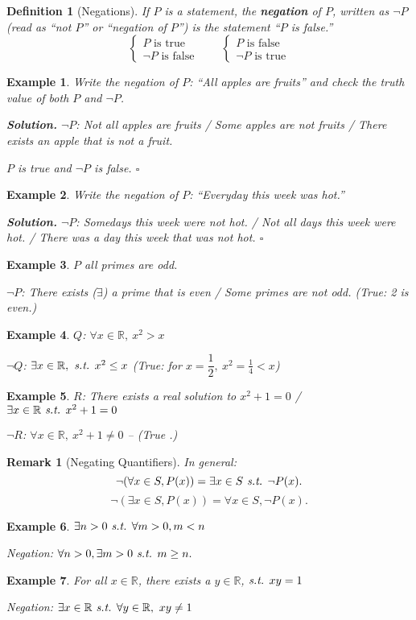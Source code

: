 \documentclass[12pt,a4paper]{article}
\newtheorem{df}{Definition}[subsection]
\newtheorem{eg}{Example}[subsection]
\newenvironment*{sol}{\par\indent\textbf{\textit{Solution. }}}{\hfill{$\square$}\par}
\newtheorem*{rmk}{\indent Remark}
\def\R{{\mathbb{R}}}
\def\st{\emph{ s.t. }}
\begin{document}
\begin{df}[Negations]
	If $P$ is a statement, the \textbf{negation} of $P$, written as $\neg P$ (read as ``not $P$'' or ``negation of $P$'') is the statement ``$P$ is false.''	
	\[\begin{cases}P\text{ is true}\\\neg P\text{ is false}\end{cases}\qquad\begin{cases}P\text{ is false}\\\neg P\text{ is true}\end{cases}\]
\end{df}
\begin{eg}
	Write the negation of $P$: ``All apples are fruits'' and check the truth value of both $P$ and $\neg P$.
	\begin{sol}
		$\neg P$: Not all apples are fruits / Some apples are not fruits / There exists an apple that is not a fruit.
		
		$P$ is true and $\neg P$ is false. 
	\end{sol}
\end{eg}
\begin{eg}
	Write the negation of $P$: ``Everyday this week was hot.''
	\begin{sol}
		$\neg P$: Somedays this week were not hot. / Not all days this week were hot. / There was a day this week that was not hot. 
	\end{sol}
\end{eg}
\begin{eg}
	$P$ all primes are odd.
	
	$\neg P$: There exists ($\exists$) a prime that is even / Some primes are not odd. (True: 2 is even.)
\end{eg}
\begin{eg}
	$Q$: $\forall x\in\R,\ x^2>x$
	
	$\neg Q$: $\exists x\in\R,\st x^2\leq x$ (True: for $x=\dfrac{1}{2},\ x^2=\frac{1}{4}<x$)	
\end{eg}
\begin{eg}
	$R$: There exists a real solution to $x^2+1=0$ / $\exists x\in\R\st x^2+1=0$
	
	$\neg R$: $\forall x\in\R,\ x^2+1\neq0$ -- (True	.)
\end{eg}
\begin{rmk}[Negating Quantifiers]
	In general: 
	\[\neg(\forall x\in S, P(x))=\exists x\in S\st\neg P(x). \]
	\[\neg(\exists x\in S, P(x))=\forall x\in S, \neg P(x). \]	
\end{rmk}
\begin{eg}
	$\exists n>0\st\forall m>0, m<n$
	
	Negation: $\forall n>0, \exists m>0\st m\geq n.$	
\end{eg}
\begin{eg}
	For all $x\in\R$, there exists a $y\in\R$,$\st xy=1$
	
	Negation: $\exists x\in\R\st\forall y\in\R,\ xy\neq1$	
\end{eg}
\end{document}
